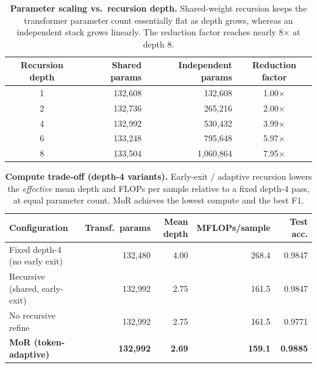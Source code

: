 \documentclass[11pt]{article}
\newcommand{\best}[1]{\textbf{#1}}
\begin{document}
\vspace{1em}
\begin{table}[h]
\centering
\caption{\textbf{Parameter scaling vs.\ recursion depth.} Shared-weight recursion keeps the
transformer parameter count essentially flat as depth grows, whereas an independent stack
grows linearly. The reduction factor reaches nearly 8$\times$ at depth 8.}
\label{tab:scaling}
\begin{tabular}{c r r c}
\toprule
\textbf{Recursion depth} & \textbf{Shared params} & \textbf{Independent params} &
\textbf{Reduction factor} \\
\midrule
1 & 132{,}608 & 132{,}608   & 1.00$\times$ \\
2 & 132{,}736 & 265{,}216   & 2.00$\times$ \\
4 & 132{,}992 & 530{,}432   & 3.99$\times$ \\
6 & 133{,}248 & 795{,}648   & 5.97$\times$ \\
8 & 133{,}504 & 1{,}060{,}864 & 7.95$\times$ \\
\bottomrule
\end{tabular}
\end{table}

\vspace{1em}
\begin{table}[h]
\centering
\caption{\textbf{Compute trade-off (depth-4 variants).} Early-exit / adaptive recursion lowers
the \emph{effective} mean depth and FLOPs per sample relative to a fixed depth-4 pass, at equal
parameter count. MoR achieves the lowest compute and the best F1.}
\label{tab:compute}
\begin{tabular}{l r r r r}
\toprule
\textbf{Configuration} & \textbf{Transf.\ params} & \textbf{Mean depth} &
\textbf{MFLOPs/sample} & \textbf{Test acc.} \\
\midrule
Fixed depth-4 (no early exit)   & 132{,}480 & 4.00 & 268.4 & 0.9847 \\
Recursive (shared, early-exit)  & 132{,}992 & 2.75 & 161.5 & 0.9847 \\
No recursive refine             & 132{,}992 & 2.75 & 161.5 & 0.9771 \\
\rowcolor{morblue} \textbf{MoR (token-adaptive)} & \textbf{132{,}992} & \textbf{2.69} & \best{159.1} & \best{0.9885} \\
\bottomrule
\end{tabular}
\end{table}
\end{document}
